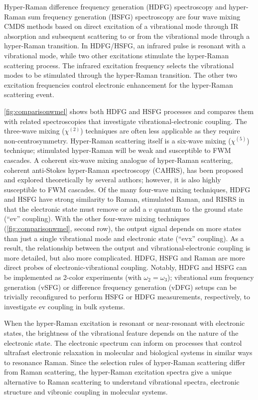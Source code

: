 \documentclass[aip, jcp, reprint, twocolumn]{revtex4-2}
\begin{document}
Hyper-Raman difference frequency generation (HDFG) spectroscopy and hyper-Raman sum frequency generation (HSFG) spectroscopy are four wave mixing CMDS methods based on direct excitation of a vibrational mode through IR absorption and subsequent scattering to or from the vibrational mode through a hyper-Raman transition.
In HDFG/HSFG, an infrared pulse is resonant with a vibrational mode, while two other excitations stimulate the hyper-Raman scattering process.
The infrared excitation frequency selects the vibrational modes to be stimulated through the hyper-Raman transition.
The other two excitation frequencies control electronic enhancement for the hyper-Raman scattering event.

\autoref{fig:comparisonwmel} shows both HDFG and HSFG processes and compares them with related spectroscopies that investigate vibrational-electronic coupling.
The three-wave mixing ($\chi^{(2)}$) techniques are often less applicable as they require non-centrosymmetry.\cite{RN227}
Hyper-Raman scattering itself is a six-wave mixing ($\chi^{(5)}$) technique; stimulated hyper-Raman will be weak and susceptible to FWM cascades.\cite{RN515, RN243, Cho2000_Cascade}
A coherent six-wave mixing analogue of hyper-Raman scattering, coherent anti-Stokes hyper-Raman spectroscopy (CAHRS), has been proposed and explored theoretically by several authors; however, it is also highly susceptible to FWM cascades.\cite{Berger1978, Bjarnason1980, RN243, Cho1997, Cho1998, Cho2000_Cascade}
Of the many four-wave mixing techniques, HDFG and HSFG have strong similarity to Raman, stimulated Raman, and RISRS in that the electronic state must remove or add a $v$ quantum to the ground state (``ev'' coupling).
With the other four-wave mixing techniques (\autoref{fig:comparisonwmel}, second row), the output signal depends on more states than just a single vibrational mode and electronic state (``evx'' coupling). 
As a result, the relationship between the output and vibrational-electronic coupling is more detailed, but also more complicated.
HDFG, HSFG and Raman are more direct probes of electronic-vibrational coupling.
Notably, HDFG and HSFG can be implemented as 2-color experiments (with $\omega_2=\omega_3$); vibrational sum frequency generation (vSFG) or difference frequency generation (vDFG) setups can be trivially reconfigured to perform HSFG or HDFG measurements, respectively, to investigate ev coupling in bulk systems.

When the hyper-Raman excitation is resonant or near-resonant with electronic states, the brightness of the vibrational feature depends on the nature of the electronic state.
The electronic spectrum can inform on processes that control ultrafast electronic relaxation in molecular and biological systems in similar ways to resonance Raman.\cite{Bredenbeck2015, Arsenault2021}
Since the selection rules of hyper-Raman scattering differ from Raman scattering, the hyper-Raman excitation spectra give a unique alternative to Raman scattering to understand vibrational spectra, electronic structure and vibronic coupling in molecular systems. \cite{Olson2018}
\end{document}
